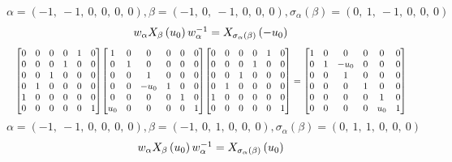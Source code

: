 \documentclass[11pt]{article}
\theoremstyle{definition}
\begin{document}
\[
\alpha = \left( -1, \  -1, \  0, \  0, \  0, \  0\right), \beta = \left( -1, \  0, \  -1, \  0, \  0, \  0\right), \sigma_{\alpha}(\beta) = \left( 0, \  1, \  -1, \  0, \  0, \  0\right)
\]
\[
\scaletoalign{\textwidth}{w_{\alpha} X_{\beta}\left(u_{0}\right) w_{\alpha}^{-1} = X_{\sigma_{\alpha}\left(\beta\right)}\left(- u_{0}\right)}
\]
\[
\scaletoalign{\textwidth}{{\left[\begin{matrix}0 & 0 & 0 & 0 & 1 & 0\\0 & 0 & 0 & 1 & 0 & 0\\0 & 0 & 1 & 0 & 0 & 0\\0 & 1 & 0 & 0 & 0 & 0\\1 & 0 & 0 & 0 & 0 & 0\\0 & 0 & 0 & 0 & 0 & 1\end{matrix}\right]} {\left[\begin{matrix}1 & 0 & 0 & 0 & 0 & 0\\0 & 1 & 0 & 0 & 0 & 0\\0 & 0 & 1 & 0 & 0 & 0\\0 & 0 & - u_{0} & 1 & 0 & 0\\0 & 0 & 0 & 0 & 1 & 0\\u_{0} & 0 & 0 & 0 & 0 & 1\end{matrix}\right]} {\left[\begin{matrix}0 & 0 & 0 & 0 & 1 & 0\\0 & 0 & 0 & 1 & 0 & 0\\0 & 0 & 1 & 0 & 0 & 0\\0 & 1 & 0 & 0 & 0 & 0\\1 & 0 & 0 & 0 & 0 & 0\\0 & 0 & 0 & 0 & 0 & 1\end{matrix}\right]} = {\left[\begin{matrix}1 & 0 & 0 & 0 & 0 & 0\\0 & 1 & - u_{0} & 0 & 0 & 0\\0 & 0 & 1 & 0 & 0 & 0\\0 & 0 & 0 & 1 & 0 & 0\\0 & 0 & 0 & 0 & 1 & 0\\0 & 0 & 0 & 0 & u_{0} & 1\end{matrix}\right]}}
\]
\[
\alpha = \left( -1, \  -1, \  0, \  0, \  0, \  0\right), \beta = \left( -1, \  0, \  1, \  0, \  0, \  0\right), \sigma_{\alpha}(\beta) = \left( 0, \  1, \  1, \  0, \  0, \  0\right)
\]
\[
\scaletoalign{\textwidth}{w_{\alpha} X_{\beta}\left(u_{0}\right) w_{\alpha}^{-1} = X_{\sigma_{\alpha}\left(\beta\right)}\left(u_{0}\right)}
\]
\end{document}
